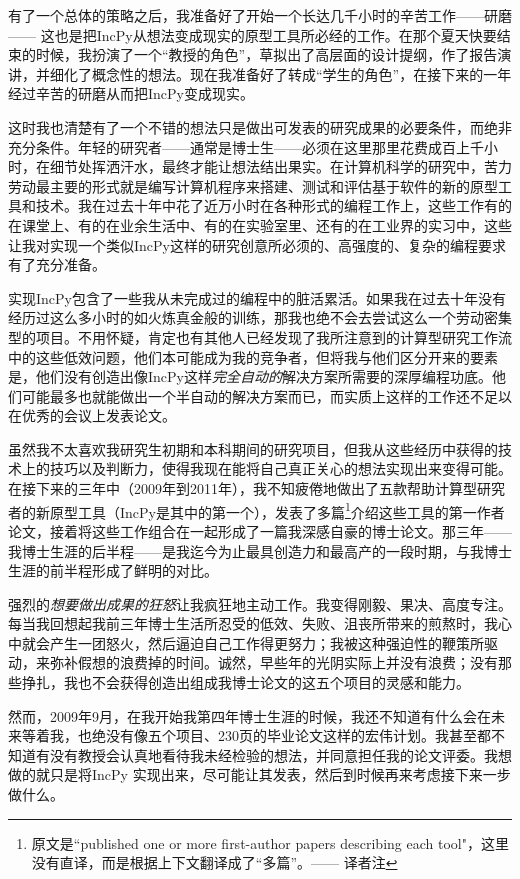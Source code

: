 \documentclass[12pt,UTF8,nofonts]{book}
\begin{document}
有了一个总体的策略之后，我准备好了开始一个长达几千小时的辛苦工作——研磨—— 这也是把IncPy从想法变成现实的原型工具所必经的工作。在那个夏天快要结束的时候，我扮演了一个“教授的角色”，草拟出了高层面的设计提纲，作了报告演讲，并细化了概念性的想法。现在我准备好了转成“学生的角色”，在接下来的一年经过辛苦的研磨从而把IncPy变成现实。

\breakline

这时我也清楚有了一个不错的想法只是做出可发表的研究成果的必要条件，而绝非充分条件。年轻的研究者——通常是博士生——必须在这里那里花费成百上千小时，在细节处挥洒汗水，最终才能让想法结出果实。在计算机科学的研究中，苦力劳动最主要的形式就是编写计算机程序来搭建、测试和评估基于软件的新的原型工具和技术。我在过去十年中花了近万小时在各种形式的编程工作上，这些工作有的在课堂上、有的在业余生活中、有的在实验室里、还有的在工业界的实习中，这些让我对实现一个类似IncPy这样的研究创意所必须的、高强度的、复杂的编程要求有了充分准备。

实现IncPy包含了一些我从未完成过的编程中的脏活累活。如果我在过去十年没有经历过这么多小时的如火炼真金般的训练，那我也绝不会去尝试这么一个劳动密集型的项目。不用怀疑，肯定也有其他人已经发现了我所注意到的计算型研究工作流中的这些低效问题，他们本可能成为我的竞争者，但将我与他们区分开来的要素是，他们没有创造出像IncPy这样\emph{完全自动的}解决方案所需要的深厚编程功底。他们可能最多也就能做出一个半自动的解决方案而已，而实质上这样的工作还不足以在优秀的会议上发表论文。

虽然我不太喜欢我研究生初期和本科期间的研究项目，但我从这些经历中获得的技术上的技巧以及判断力，使得我现在能将自己真正关心的想法实现出来变得可能。在接下来的三年中（2009年到2011年），我不知疲倦地做出了五款帮助计算型研究者的新原型工具（IncPy是其中的第一个），发表了多篇\footnote{原文是``published one or more first-author papers describing each tool"，这里没有直译，而是根据上下文翻译成了“多篇”。—— 译者注}介绍这些工具的第一作者论文，接着将这些工作组合在一起形成了一篇我深感自豪的博士论文。那三年——我博士生涯的后半程——是我迄今为止最具创造力和最高产的一段时期，与我博士生涯的前半程形成了鲜明的对比。

强烈的\emph{想要做出成果的狂怒}让我疯狂地主动工作。我变得刚毅、果决、高度专注。每当我回想起我前三年博士生活所忍受的低效、失败、沮丧所带来的煎熬时，我心中就会产生一团怒火，然后逼迫自己工作得更努力；我被这种强迫性的鞭策所驱动，来弥补假想的浪费掉的时间。诚然，早些年的光阴实际上并没有浪费；没有那些挣扎，我也不会获得创造出组成我博士论文的这五个项目的灵感和能力。

\breakline

然而，2009年9月，在我开始我第四年博士生涯的时候，我还不知道有什么会在未来等着我，也绝没有像五个项目、230页的毕业论文这样的宏伟计划。我甚至都不知道有没有教授会认真地看待我未经检验的想法，并同意担任我的论文评委。我想做的就只是将IncPy 实现出来，尽可能让其发表，然后到时候再来考虑接下来一步做什么。
\end{document}
